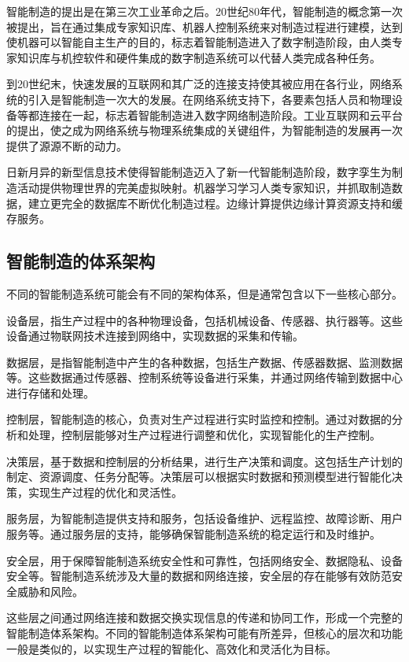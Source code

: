 \documentclass[lang=cn,12pt,bibtex,newtx,twoside,margintrue,citestyle=gb7714-2015, bibstyle=gb7714-2015]{elegantbook}
\begin{document}
智能制造的提出是在第三次工业革命之后。20世纪80年代，智能制造的概念第一次被提出，旨在通过集成专家知识库、机器人控制系统来对制造过程进行建模，达到使机器可以智能自主生产的目的，标志着智能制造进入了数字制造阶段，由人类专家知识库与机控软件和硬件集成的数字制造系统可以代替人类完成各种任务。

到20世纪末，快速发展的互联网和其广泛的连接支持使其被应用在各行业，网络系统的引入是智能制造一次大的发展。在网络系统支持下，各要素包括人员和物理设备等都连接在一起，标志着智能制造进入数字网络制造阶段。工业互联网和云平台的提出，使之成为网络系统与物理系统集成的关键组件，为智能制造的发展再一次提供了源源不断的动力。

日新月异的新型信息技术使得智能制造迈入了新一代智能制造阶段，数字孪生为制造活动提供物理世界的完美虚拟映射。机器学习学习人类专家知识，并抓取制造数据，建立更完全的数据库不断优化制造过程。边缘计算提供边缘计算资源支持和缓存服务。


\subsection{智能制造的体系架构}
\label{sec:orgc946446}
不同的智能制造系统可能会有不同的架构体系，但是通常包含以下一些核心部分。

设备层，指生产过程中的各种物理设备，包括机械设备、传感器、执行器等。这些设备通过物联网技术连接到网络中，实现数据的采集和传输。

数据层，是指智能制造中产生的各种数据，包括生产数据、传感器数据、监测数据等。这些数据通过传感器、控制系统等设备进行采集，并通过网络传输到数据中心进行存储和处理。

控制层，智能制造的核心，负责对生产过程进行实时监控和控制。通过对数据的分析和处理，控制层能够对生产过程进行调整和优化，实现智能化的生产控制。

决策层，基于数据和控制层的分析结果，进行生产决策和调度。这包括生产计划的制定、资源调度、任务分配等。决策层可以根据实时数据和预测模型进行智能化决策，实现生产过程的优化和灵活性。

服务层，为智能制造提供支持和服务，包括设备维护、远程监控、故障诊断、用户服务等。通过服务层的支持，能够确保智能制造系统的稳定运行和及时维护。

安全层，用于保障智能制造系统安全性和可靠性，包括网络安全、数据隐私、设备安全等。智能制造系统涉及大量的数据和网络连接，安全层的存在能够有效防范安全威胁和风险。

这些层之间通过网络连接和数据交换实现信息的传递和协同工作，形成一个完整的智能制造体系架构。不同的智能制造体系架构可能有所差异，但核心的层次和功能一般是类似的，以实现生产过程的智能化、高效化和灵活化为目标。
\end{document}
